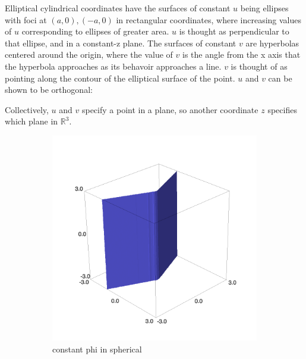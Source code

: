 \documentclass{article}
\begin{document}
Elliptical cylindrical coordinates have the surfaces of constant $u$ being ellipses with foci at $(a,0), (-a,0)$ in rectangular coordinates, where increasing values of $u$ corresponding to ellipses of greater area. $\unit{u}$ is thought as perpendicular to that ellipse, and in a constant-z plane. The surfaces of constant $v$ are hyperbolas centered around the origin, where the value of $v$ is the angle from the x axis that the hyperbola approaches as its behavoir approaches a line. $\unit{v}$ is thought of as pointing along the contour of the elliptical surface of the point. $\unit{u}$ and $\unit{v}$ can be shown to be orthogonal:

Collectively, $u$ and $v$ specify a point in a plane, so another coordinate $z$ specifies which plane in $\mathbb{R}^3$.

\begin{figure}
    \centering
    \begin{subfigure}[b]{0.3\textwidth}
        \includegraphics[width=\textwidth]{images/spherical_phi.png}
        \caption{constant phi in spherical}
    \end{subfigure}
    \begin{subfigure}[b]{0.3\textwidth}

\end{subfigure}
\end{figure}
\end{document}
